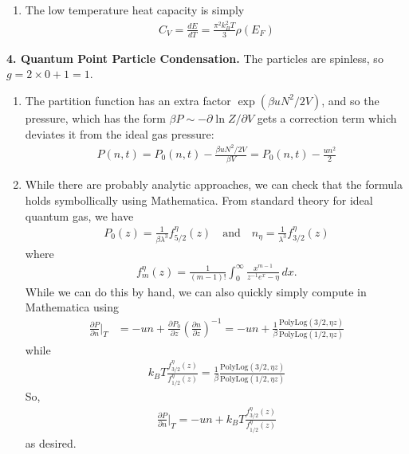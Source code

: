 \documentclass{article}
\theoremstyle{definition}
\newcommand{\p}{\partial}
\newcommand{\be}{\beta}
\newcommand{\f}[2]{\frac{#1}{#2}}
\newcommand{\lp}{\left(}
\newcommand{\rp}{\right)}
\begin{document}
\begin{enumerate}[label=(\alph*)]
	\item The low temperature heat capacity is simply
	\begin{align*}
	C_V = \f{dE}{dT} = \boxed{\f{\pi^2  k_B^2 T }{3} \rho(E_F)}
	\end{align*}
\end{enumerate}




\noindent \textbf{4. Quantum Point Particle Condensation.} The particles are spinless, so $g = 2\times 0+1 = 1$. 

\begin{enumerate}[label=(\alph*)]
	\item The partition function has an extra factor $\exp(\be u N^2/2V)$, and so the pressure, which has the form $\be P \sim -\p \ln Z/\p V$ gets a correction term which deviates it from the ideal gas pressure:
	\begin{align*}
	P(n,t) = P_0(n,t) - \f{\be u N^2/2V}{\be V} = P_0(n,t) - \f{u n^2}{2}
	\end{align*} 
	
	\item While there are probably analytic approaches, we can check that the formula holds symbollically using Mathematica. From standard theory for ideal quantum gas, we have
	\begin{align*}
	P_0(z) = \f{1}{\be \lambda^3} f^\eta_{5/2}(z) \quad \text{and}\quad n_\eta = \f{1}{\lambda^3}f^\eta_{3/2}(z)
	\end{align*}
	where
	\begin{align*}
	f^\eta_m(z) = \f{1}{(m-1)!}\int_0^\infty \f{x^{m-1}}{z^{-1} e^x - \eta}\,dx.
	\end{align*}
	While we can do this by hand, we can also quickly simply compute in Mathematica using 
	\begin{align*}
	\f{\p P}{\p n}\bigg\vert_T 
	&= -un + \f{\p P_0}{\p z} \lp \f{\p n}{\p z} \rp^{-1} = -un + \f{1}{\be} \f{\text{PolyLog}(3/2, \eta z)}{\text{PolyLog}(1/2,\eta z)}
	\end{align*}
	while 
	\begin{align*}
	k_BT \f{f^\eta_{3/2}(z)}{f^\eta_{1/2}(z)} = \f{1}{\be} \f{\text{PolyLog}(3/2, \eta z)}{\text{PolyLog}(1/2,\eta z)}
	\end{align*}
	So, 
	\begin{align*}
	\f{\p P}{\p n}\bigg\vert_T = -un + k_BT \f{f^\eta_{3/2}(z)}{f^\eta_{1/2}(z)}
	\end{align*}
	as desired. 
	
	
	

\end{enumerate}
\end{document}
